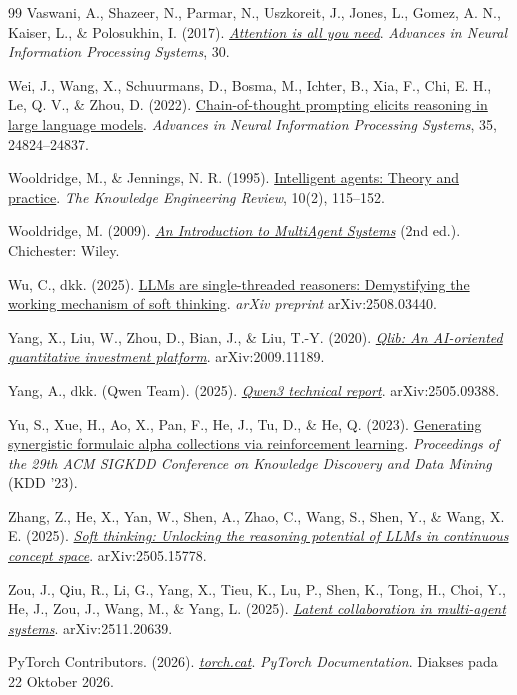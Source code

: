 \begin{thebibliography}{99}
Vaswani, A., Shazeer, N., Parmar, N., Uszkoreit, J., Jones, L., Gomez, A. N.,
Kaiser, L., \& Polosukhin, I. (2017).
\href{https://arxiv.org/abs/1706.03762}{\emph{Attention is all you need}}.
\emph{Advances in Neural Information Processing Systems}, 30.

Wei, J., Wang, X., Schuurmans, D., Bosma, M., Ichter, B., Xia, F., Chi, E. H.,
Le, Q. V., \& Zhou, D. (2022).
\href{https://arxiv.org/abs/2201.11903}{Chain-of-thought prompting elicits
reasoning in large language models}. \emph{Advances in Neural Information
Processing Systems}, 35, 24824--24837.

Wooldridge, M., \& Jennings, N. R. (1995).
\href{https://doi.org/10.1017/S0269888900008122}{Intelligent agents: Theory and
practice}. \emph{The Knowledge Engineering Review}, 10(2), 115--152.

Wooldridge, M. (2009).
\href{https://archive.org/details/introductiontomu0000wool}{\emph{An
Introduction to MultiAgent Systems}} (2nd ed.). Chichester: Wiley.

Wu, C., dkk. (2025).
\href{https://arxiv.org/abs/2508.03440}{LLMs are single-threaded reasoners:
Demystifying the working mechanism of soft thinking}. \emph{arXiv preprint}
arXiv:2508.03440.

Yang, X., Liu, W., Zhou, D., Bian, J., \& Liu, T.-Y. (2020).
\href{https://arxiv.org/abs/2009.11189}{\emph{Qlib: An AI-oriented quantitative
investment platform}}. arXiv:2009.11189.

Yang, A., dkk. (Qwen Team). (2025).
\href{https://arxiv.org/abs/2505.09388}{\emph{Qwen3 technical report}}.
arXiv:2505.09388.

Yu, S., Xue, H., Ao, X., Pan, F., He, J., Tu, D., \& He, Q. (2023).
\href{https://arxiv.org/abs/2306.12964}{Generating synergistic formulaic alpha
collections via reinforcement learning}. \emph{Proceedings of the 29th ACM
SIGKDD Conference on Knowledge Discovery and Data Mining} (KDD '23).

Zhang, Z., He, X., Yan, W., Shen, A., Zhao, C., Wang, S., Shen, Y., \& Wang,
X. E. (2025).
\href{https://arxiv.org/abs/2505.15778}{\emph{Soft thinking: Unlocking the
reasoning potential of LLMs in continuous concept space}}. arXiv:2505.15778.

Zou, J., Qiu, R., Li, G., Yang, X., Tieu, K., Lu, P., Shen, K., Tong, H.,
Choi, Y., He, J., Zou, J., Wang, M., \& Yang, L. (2025).
\href{https://arxiv.org/abs/2511.20639}{\emph{Latent collaboration in multi-agent
systems}}. arXiv:2511.20639.

PyTorch Contributors. (2026).
\href{https://docs.pytorch.org/docs/stable/generated/torch.cat.html}
{\textit{torch.cat}}.
\emph{PyTorch Documentation}.
Diakses pada 22 Oktober 2026.


\end{thebibliography}
